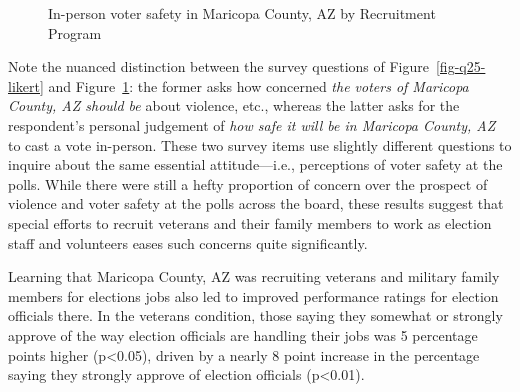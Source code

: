 \documentclass[
  11pt,
  a4paper,
]{article}
\begin{document}
\begin{figure}

\caption{\label{fig-q26-likert}In-person voter safety in Maricopa
County, AZ by Recruitment Program}


\end{figure}%

Note the nuanced distinction between the survey questions of
Figure~\ref{fig-q25-likert} and Figure~\ref{fig-q26-likert}: the former
asks how concerned \emph{the voters of Maricopa County, AZ should be}
about violence, etc., whereas the latter asks for the respondent's
personal judgement of \emph{how safe it will be in Maricopa County, AZ}
to cast a vote in-person. These two survey items use slightly different
questions to inquire about the same essential attitude---i.e.,
perceptions of voter safety at the polls. While there were still a hefty
proportion of concern over the prospect of violence and voter safety at
the polls across the board, these results suggest that special efforts
to recruit veterans and their family members to work as election staff
and volunteers eases such concerns quite significantly.

Learning that Maricopa County, AZ was recruiting veterans and military
family members for elections jobs also led to improved performance
ratings for election officials there. In the veterans condition, those
saying they somewhat or strongly approve of the way election officials
are handling their jobs was 5 percentage points higher (p\textless0.05),
driven by a nearly 8 point increase in the percentage saying they
strongly approve of election officials (p\textless0.01).
\end{document}
